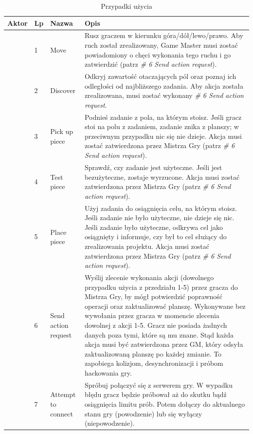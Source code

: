 \documentclass[11pt]{article}
\begin{document}
\hspace*{-4cm}
\begin{longtable}{|p{}|p{}|p{}|p{}|}
\caption{Przypadki użycia}
\\
\hline
Aktor 
& Lp 
& Nazwa 
& Opis 
\\ \hline
\endhead
\hline
\endfoot
\multirow{11}{.20\textwidth}{Gracz/Kapitan Drużyny} 
& 1 
& Move 
& Rusz graczem w kierunku góra/dół/lewo/prawo. Aby ruch został zrealizowany, Game Master musi zostać powiadomiony o chęci wykonania tego ruchu i go zatwierdzić (patrz \textit{\# 6 Send action request}). 
\\ \cline{2-4}
& 2 
& Discover 
& Odkryj zawartość otaczających pól oraz poznaj ich odległości od najbliższego zadania. Aby akcja została zrealizowana, musi zostać wykonany \textit{\# 6 Send action request}.
\\ \cline{2-4}
& 3 
& Pick up piece 
& Podnieś zadanie z pola, na którym stoisz. Jeśli gracz stoi na polu z zadaniem, zadanie znika z planszy; w przeciwnym przypadku nic się nie dzieje. Akcja musi zostać zatwierdzona przez Mistrza Gry (patrz \textit{\# 6 Send action request}).
\\ \cline{2-4}
& 4 
& Test piece 
& Sprawdź, czy zadanie jest użyteczne. Jeśli jest bezużyteczne, zostaje wyrzucone. Akcja musi zostać zatwierdzona przez Mistrza Gry (patrz \textit{\# 6 Send action request}).
\\ \cline{2-4}
& 5 
& Place piece 
& Użyj zadania do osiągnięcia celu, na którym stoisz. Jeśli zadanie nie było użyteczne, nie dzieje się nic. Jeśli zadanie było użyteczne, odkrywa cel jako osiągnięty i informuje, czy był to cel służący do zrealizowania projektu. Akcja musi zostać zatwierdzona przez Mistrza Gry (patrz \textit{\# 6 Send action request}). 
\\ \cline{2-4}
& 6 
& Send action request 
& Wyślij zlecenie wykonania akcji (dowolnego przypadku użycia z przedziału 1-5) przez gracza do Mistrza Gry, by mógł potwierdzić poprawność operacji oraz zaktualizować planszę. Wykonywane bez wywołania przez gracza w momencie zlecenia dowolnej z akcji 1-5. Gracz nie posiada żadnych danych poza tymi, które są mu znane. Stąd każda akcja musi być zatwierdzona przez GM, który odsyła zaktualizowaną planszę po każdej zmianie. To zapobiega kolizjom, desynchronizacji i próbom hackowania gry.
\\ \cline{2-4}
& 7 
& Attempt to connect 
& Spróbuj połączyć się z serwerem gry. W wypadku błędu gracz będzie próbował aż do skutku bądź osiągnięcia limitu prób. Potem dołączy do aktualnego stanu gry (powodzenie) lub się wyłączy (niepowodzenie).

\end{longtable}
\end{document}
